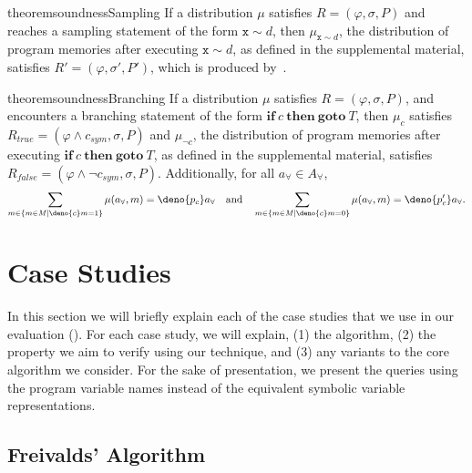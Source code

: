 \documentclass[acmsmall,review,anonymous]{acmart}\settopmatter{printfolios=true,printccs=false,printacmref=false}
\begin{document}
\begin{restatable}{theorem}{soundnessSampling}
  If a distribution $\mu$ satisfies $R = (\varphi,\sigma,P)$ and~ reaches a sampling statement of the form $\mathtt{x} \sim d$, then $\mu_{\mathtt{x} \sim d}$, the distribution of program memories after executing $\mathtt{x} \sim d$, as defined in the supplemental material, satisfies $R'=(\varphi,\sigma',P')$, which is produced by~.
\end{restatable}

\begin{restatable}{theorem}{soundnessBranching}\label{thm:branch}
  If a distribution $\mu$ satisfies $R=(\varphi,\sigma,P)$, and~ encounters a branching statement of the form $\mathbf{if}~c~\mathbf{then~goto}~T$, then $\mu_c$ satisfies $R_{true} = (\varphi \wedge c_{sym}, \sigma, P)$ and $\mu_{\neg c}$, the distribution of program memories after executing $\mathbf{if}~c~\mathbf{then~goto}~T$, as defined in the supplemental material, satisfies $R_{false} = (\varphi \wedge \neg c_{sym}, \sigma, P)$. Additionally, for all $a_{\forall} \in \mathit{A}_{\forall}$,
  \[
    \sum_{m \in \{m \in \mathit{M} \mid \deno{c}m = 1\}}\mu(a_{\forall},m) = \deno{p_c} a_{\forall}\quad\text{and}\quad\sum_{m \in \{m \in \mathit{M} \mid \deno{c}m = 0\}}\mu(a_{\forall},m) = \deno{p_c'} a_{\forall}.
  \]
\end{restatable}


\section{Case Studies}
\label{sec:case_studies}
In this section we will briefly explain each of the case studies that we use in our evaluation ().
% 
For each case study, we will explain, (1) the algorithm, (2) the property we aim to verify using our technique, and (3) any variants to the core algorithm we consider.
% 
For the sake of presentation, we present the queries using the program variable names instead of the equivalent symbolic variable representations.


\subsection{Freivalds' Algorithm}
\label{sec:freivalds}
\end{document}
